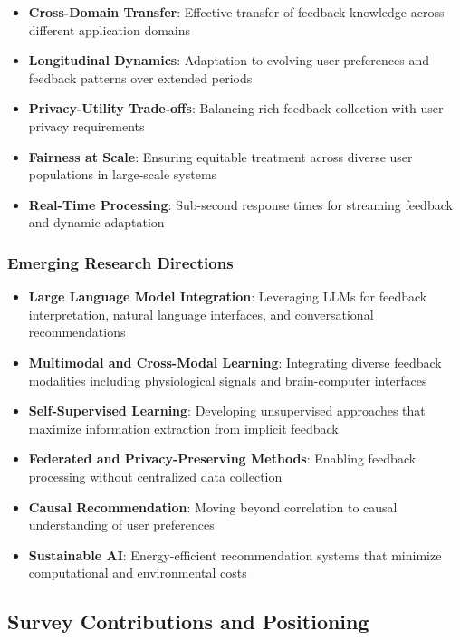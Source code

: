 \begin{itemize}
    \item \textbf{Cross-Domain Transfer}: Effective transfer of feedback knowledge across different application domains
    \item \textbf{Longitudinal Dynamics}: Adaptation to evolving user preferences and feedback patterns over extended periods
    \item \textbf{Privacy-Utility Trade-offs}: Balancing rich feedback collection with user privacy requirements
    \item \textbf{Fairness at Scale}: Ensuring equitable treatment across diverse user populations in large-scale systems
    \item \textbf{Real-Time Processing}: Sub-second response times for streaming feedback and dynamic adaptation
\end{itemize}

\subsubsection{Emerging Research Directions}

\begin{itemize}
    \item \textbf{Large Language Model Integration}: Leveraging LLMs for feedback interpretation, natural language interfaces, and conversational recommendations
    \item \textbf{Multimodal and Cross-Modal Learning}: Integrating diverse feedback modalities including physiological signals and brain-computer interfaces
    \item \textbf{Self-Supervised Learning}: Developing unsupervised approaches that maximize information extraction from implicit feedback
    \item \textbf{Federated and Privacy-Preserving Methods}: Enabling feedback processing without centralized data collection
    \item \textbf{Causal Recommendation}: Moving beyond correlation to causal understanding of user preferences
    \item \textbf{Sustainable AI}: Energy-efficient recommendation systems that minimize computational and environmental costs
\end{itemize}

\subsection{Survey Contributions and Positioning}

